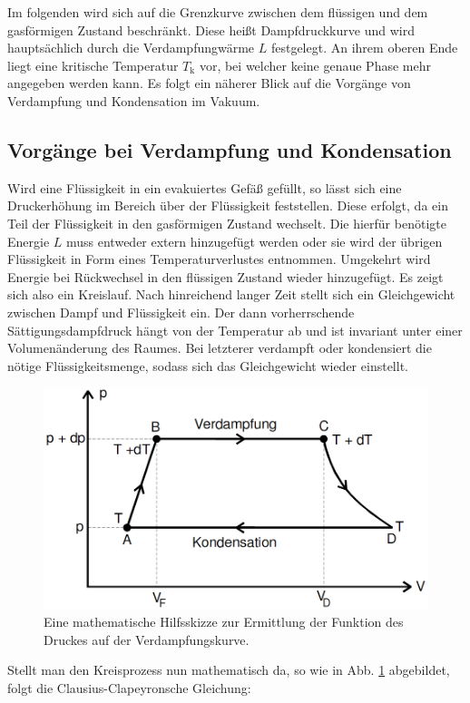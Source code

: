      Im folgenden wird sich auf die Grenzkurve zwischen dem flüssigen und dem
      gasförmigen Zustand beschränkt. Diese heißt Dampfdruckkurve und wird hauptsächlich durch die
      Verdampfungwärme $L$ festgelegt. An ihrem oberen Ende liegt eine kritische
       Temperatur $T_\text{k}$ vor, bei welcher keine genaue Phase mehr angegeben werden kann. Es folgt ein näherer Blick auf die Vorgänge von
      Verdampfung und Kondensation im Vakuum.
\subsection{Vorgänge bei Verdampfung und Kondensation}
Wird eine Flüssigkeit in ein evakuiertes Gefäß gefüllt, so lässt sich eine
 Druckerhöhung im Bereich über der Flüssigkeit feststellen. Diese erfolgt, da ein Teil der
  Flüssigkeit in den gasförmigen Zustand wechselt. Die hierfür benötigte
   Energie $L$ muss entweder extern hinzugefügt werden oder sie wird der übrigen
    Flüssigkeit in Form eines Temperaturverlustes entnommen. Umgekehrt wird
     Energie bei Rückwechsel in den flüssigen Zustand wieder hinzugefügt. Es
      zeigt sich also ein Kreislauf. Nach hinreichend langer Zeit stellt sich
       ein Gleichgewicht zwischen Dampf und Flüssigkeit ein. Der dann vorherrschende
        Sättigungsdampfdruck hängt von der Temperatur ab und ist invariant
         unter einer Volumenänderung des Raumes. Bei letzterer
         verdampft oder kondensiert die nötige Flüssigkeitsmenge, sodass sich das Gleichgewicht wieder einstellt.
         \begin{figure}
         	\centering
         	\includegraphics[width=\linewidth-150pt,height=\textheight-150pt,keepaspectratio]{content/Bilder/Kreislauf.png}
         	\caption{Eine mathematische Hilfsskizze zur Ermittlung der Funktion des Druckes auf der Verdampfungskurve\cite{V203}.}
         	\label{fig:Kreislauf}
         \end{figure}
         Stellt man den Kreisprozess nun mathematisch da, so wie in Abb. \ref{fig:Kreislauf} abgebildet, folgt die Clausius-Clapeyronsche Gleichung:
